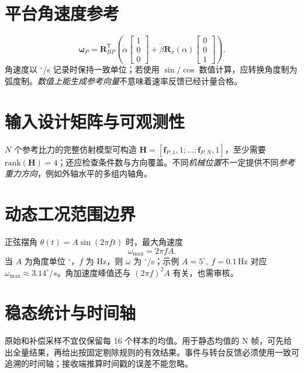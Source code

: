 \section{平台角速度参考}
\begin{equation}
\bm\omega_P=\mathbf R_{BP}^{\mathsf T}\left(\dot\alpha\begin{bmatrix}1\\0\\0\end{bmatrix}
+\dot\beta\mathbf R_x(\alpha)\begin{bmatrix}0\\0\\1\end{bmatrix}\right).
\end{equation}
角速度以 $^\circ$/s 记录时保持一致单位；若使用 $\sin/\cos$ 数值计算，应转换角度制为弧度制。\emph{数值上能生成参考向量}不意味着速率反馈已经计量合格。
\section{输入设计矩阵与可观测性}
$N$ 个参考比力的完整仿射模型可构造 $\mathbf H=[\bm f_{P,1},1;\ldots;\bm f_{P,N},1]$，至少需要 $\mathrm{rank}(\mathbf H)=4$；还应检查条件数与方向覆盖。不同\emph{机械位置}不一定提供不同\emph{参考重力方向}，例如外轴水平的多组内轴角。
\section{动态工况范围边界}
正弦摆角 $\theta(t)=A\sin(2\pi f t)$ 时，最大角速度
\begin{equation}
\omega_{\max}=2\pi f A.
\end{equation}
当 $A$ 为角度单位 $^\circ$，$f$ 为 Hz，则 $\omega$ 为 $^\circ$/s；示例 $A=5^\circ,\ f=0.1\,\mathrm{Hz}$ 对应 $\omega_{\max}\approx3.14^\circ/s$。角加速度峰值还与 $(2\pi f)^2A$ 有关，也需审核。
\section{稳态统计与时间轴}
原始和补偿采样不宜仅保留每 16 个样本的均值。用于静态均值的 N 帧，可先给出全量结果，再给出按固定剔除规则的有效结果。事件与转台反馈必须使用一致可追溯的时间轴；接收端推算时间戳的误差不能忽略。

